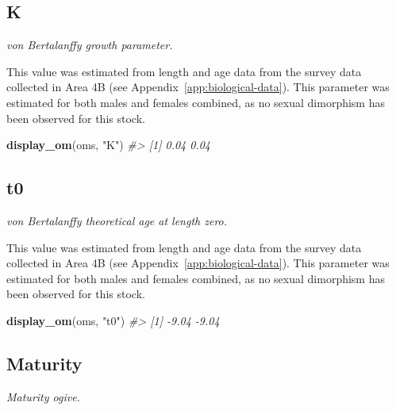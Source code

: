 \documentclass[11pt]{book}
\newenvironment{Shaded}{\begin{snugshade}}{\end{snugshade}}
\newcommand{\CommentTok}[1]{\textcolor[rgb]{0.56,0.35,0.01}{\textit{#1}}}
\newcommand{\KeywordTok}[1]{\textcolor[rgb]{0.13,0.29,0.53}{\textbf{#1}}}
\newcommand{\NormalTok}[1]{#1}
\newcommand{\StringTok}[1]{\textcolor[rgb]{0.31,0.60,0.02}{#1}}
\begin{document}
\subsection{K}

\emph{von Bertalanffy growth parameter.}

This value was estimated from length and age data from the survey data collected in Area 4B (see Appendix~\ref{app:biological-data}). This parameter was estimated for both males and females combined, as no sexual dimorphism has been observed for this stock.
\begin{Shaded}
\begin{Highlighting}[]
\KeywordTok{display_om}\NormalTok{(oms, }\StringTok{"K"}\NormalTok{)}
\CommentTok{#> [1] 0.04 0.04}
\end{Highlighting}
\end{Shaded}
\label{app:desc-stock-t0-yelloweye}
\subsection{t0}

\emph{von Bertalanffy theoretical age at length zero.}

This value was estimated from length and age data from the survey data collected in Area 4B (see Appendix~\ref{app:biological-data}). This parameter was estimated for both males and females combined, as no sexual dimorphism has been observed for this stock.
\begin{Shaded}
\begin{Highlighting}[]
\KeywordTok{display_om}\NormalTok{(oms, }\StringTok{"t0"}\NormalTok{)}
\CommentTok{#> [1] -9.04 -9.04}
\end{Highlighting}
\end{Shaded}
\label{app:desc-stock-maturity-yelloweye}
\subsection{Maturity}

\emph{Maturity ogive.}
\end{document}

